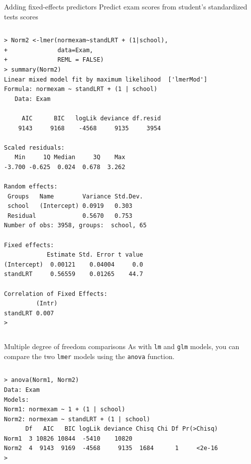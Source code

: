\documentclass[table,smaller]{beamer}
\begin{document}
\begin{frame}[fragile,label=sec-5-4]{Adding fixed-effects predictors}
 Predict exam scores from student's standardized tests scores

\vspace{-.5em}
\begin{columns}
\begin{block}{}
\begin{verbatim}
> Norm2 <-lmer(normexam~standLRT + (1|school),
+              data=Exam,
+              REML = FALSE) 
> summary(Norm2) 
Linear mixed model fit by maximum likelihood  ['lmerMod']
Formula: normexam ~ standLRT + (1 | school)
   Data: Exam

     AIC      BIC   logLik deviance df.resid 
    9143     9168    -4568     9135     3954 

Scaled residuals: 
   Min     1Q Median     3Q    Max 
-3.700 -0.625  0.024  0.678  3.262 

Random effects:
 Groups   Name        Variance Std.Dev.
 school   (Intercept) 0.0919   0.303   
 Residual             0.5670   0.753   
Number of obs: 3958, groups:  school, 65

Fixed effects:
            Estimate Std. Error t value
(Intercept)  0.00121    0.04004     0.0
standLRT     0.56559    0.01265    44.7

Correlation of Fixed Effects:
         (Intr)
standLRT 0.007 
>
\end{verbatim}
\end{block}
\end{columns}
\vspace{.5em}
\end{frame}


\begin{frame}[fragile,label=sec-5-5]{Multiple degree of freedom comparisons}
 As with \texttt{lm} and \texttt{glm} models, you can compare the two \texttt{lmer} models using the \texttt{anova} function.

\vspace{-.5em}
\begin{columns}
\begin{block}{}
\begin{verbatim}
> anova(Norm1, Norm2)
Data: Exam
Models:
Norm1: normexam ~ 1 + (1 | school)
Norm2: normexam ~ standLRT + (1 | school)
      Df   AIC   BIC logLik deviance Chisq Chi Df Pr(>Chisq)
Norm1  3 10826 10844  -5410    10820                        
Norm2  4  9143  9169  -4568     9135  1684      1     <2e-16
>
\end{verbatim}
\end{block}
\end{columns}
\vspace{.5em}
\end{frame}
\end{document}
